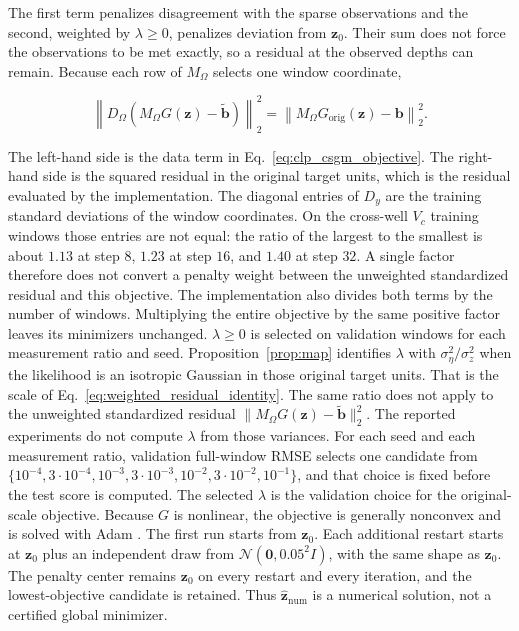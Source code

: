 The first term penalizes disagreement with the sparse observations and the
second, weighted by $\lambda\geq 0$, penalizes deviation from
$\boldsymbol{z}_0$. Their sum does not force
the observations to be met exactly, so a residual at the observed depths can
remain. Because each row of $M_{\Omega}$ selects one window coordinate,

\begin{equation}
\left\|
D_{\Omega}
\left(
M_{\Omega}G(\boldsymbol{z})
-
\widetilde{\boldsymbol{b}}
\right)
\right\|_2^2
=
\left\|
M_{\Omega}G_{\mathrm{orig}}(\boldsymbol{z})
-
\boldsymbol{b}
\right\|_2^2.
\label{eq:weighted_residual_identity}
\end{equation}

The left-hand side is the data term in
Eq.~\eqref{eq:clp_csgm_objective}. The right-hand side is the squared
residual in the original target units, which is the residual evaluated by
the implementation. The diagonal entries of $D_y$ are the training standard
deviations of the window coordinates. On the cross-well $V_c$ training
windows those entries are not equal: the ratio of the largest to the
smallest is about $1.13$ at step $8$, $1.23$ at step $16$, and $1.40$ at
step $32$. A single factor therefore does not convert a penalty weight
between the unweighted standardized residual and this objective. The
implementation also divides both terms by the number of windows. Multiplying
the entire objective by the same positive factor leaves its minimizers
unchanged. $\lambda\geq0$ is selected on validation
windows for each measurement ratio and seed.
Proposition~\ref{prop:map} identifies $\lambda$ with
$\sigma_{\eta}^{2}/\sigma_{z}^{2}$ when the likelihood is an isotropic
Gaussian in those original target units. That is the scale of
Eq.~\eqref{eq:weighted_residual_identity}. The same ratio does not apply to
the unweighted standardized residual
$\|M_{\Omega}G(\boldsymbol{z})-\widetilde{\boldsymbol{b}}\|_2^2$. The
reported experiments do not compute $\lambda$ from those variances. For
each seed and each measurement ratio, validation full-window RMSE selects
one candidate from
$\{10^{-4},3\cdot10^{-4},10^{-3},3\cdot10^{-3},10^{-2},3\cdot10^{-2},10^{-1}\}$,
and that choice is fixed before the test score is computed. The selected
$\lambda$ is the validation choice for the original-scale objective.
Because $G$ is nonlinear, the
objective is generally nonconvex and is solved with Adam
\citep{kingma2015adam}. The first run starts from $\boldsymbol{z}_0$. Each
additional restart starts at $\boldsymbol{z}_0$ plus an independent draw from
$\mathcal{N}(\boldsymbol{0},0.05^{2}I)$, with the same shape as
$\boldsymbol{z}_0$. The penalty center remains $\boldsymbol{z}_0$ on every
restart and every iteration, and the lowest-objective candidate is
retained. Thus $\widehat{\boldsymbol{z}}_{\mathrm{num}}$ is a numerical
solution, not a certified global minimizer.

